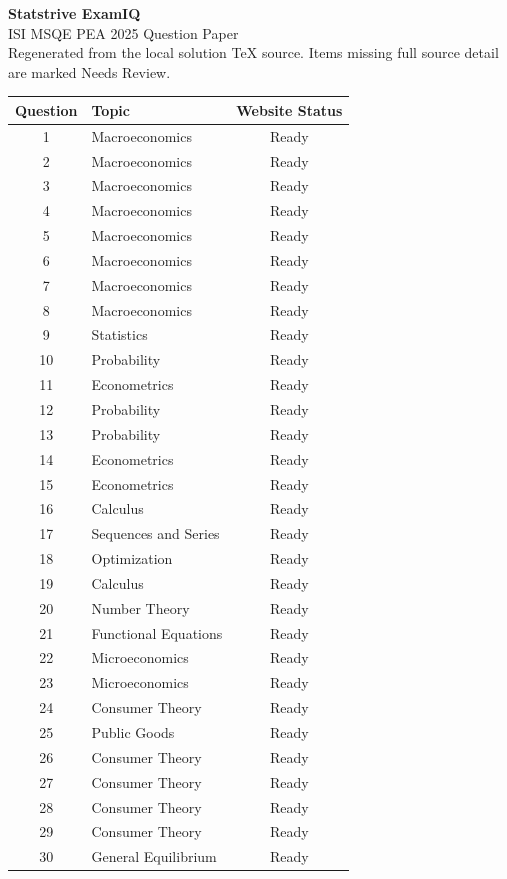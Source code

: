 \documentclass[11pt]{article}
\begin{document}
\begin{center}
{\Huge \textbf{Statstrive ExamIQ}}\\[6pt]
{\Large ISI MSQE PEA 2025 Question Paper}\\[4pt]
{\small Regenerated from the local solution TeX source. Items missing full source detail are marked Needs Review.}
\end{center}

\vspace{0.5cm}
\begin{longtable}{c l c}
\toprule
Question & Topic & Website Status \\
\midrule
\endhead
1 & Macroeconomics & Ready \\
2 & Macroeconomics & Ready \\
3 & Macroeconomics & Ready \\
4 & Macroeconomics & Ready \\
5 & Macroeconomics & Ready \\
6 & Macroeconomics & Ready \\
7 & Macroeconomics & Ready \\
8 & Macroeconomics & Ready \\
9 & Statistics & Ready \\
10 & Probability & Ready \\
11 & Econometrics & Ready \\
12 & Probability & Ready \\
13 & Probability & Ready \\
14 & Econometrics & Ready \\
15 & Econometrics & Ready \\
16 & Calculus & Ready \\
17 & Sequences and Series & Ready \\
18 & Optimization & Ready \\
19 & Calculus & Ready \\
20 & Number Theory & Ready \\
21 & Functional Equations & Ready \\
22 & Microeconomics & Ready \\
23 & Microeconomics & Ready \\
24 & Consumer Theory & Ready \\
25 & Public Goods & Ready \\
26 & Consumer Theory & Ready \\
27 & Consumer Theory & Ready \\
28 & Consumer Theory & Ready \\
29 & Consumer Theory & Ready \\
30 & General Equilibrium & Ready \\
\bottomrule
\end{longtable}
\end{document}
